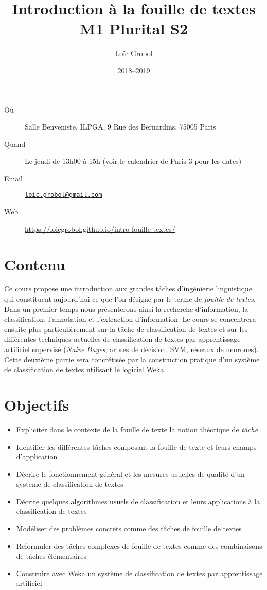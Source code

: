 \documentclass[a4paper, 11pt]{article}
\title{Introduction à la fouille de textes\\M1 Plurital S2}
\author{Loïc Grobol}
\date{2018–2019}
\begin{document}
\vspace*{-7em}
{\let\newpage\relax\maketitle}
\thispagestyle{main}

\begin{description}
    \item[Où] Salle Benveniste, ILPGA, 9 Rue des Bernardins, 75005 Paris
    \item[Quand] Le jeudi de 13h00 à 15h (voir le calendrier de Paris 3 pour les dates)
    \item[Email] \href{mailto:loic.grobol@gmail.com}{\texttt{loic.grobol@gmail.com}}
    \item[Web] \url{https://loicgrobol.github.io/intro-fouille-textes/}
\end{description}

\section*{Contenu}
Ce cours propose une introduction aux grandes tâches d'ingénierie linguistique qui constituent aujourd'hui ce que l'on désigne par le terme de \emph{fouille de textes}.
Dans un premier temps nous présenterons ainsi la recherche d'information, la classification, l'annotation et l'extraction d'information.
Le  cours se  concentrera ensuite plus particulièrement sur la tâche de classification de textes et sur les différentes techniques actuelles de classification de textes par apprentissage artificiel supervisé (\emph{Naive Bayes}, arbres de décision, SVM, réseaux de neurones).
Cette deuxième partie sera concrétisée par la construction pratique d'un système de classification de textes utilisant le logiciel Weka.

\section*{Objectifs}

\begin{itemize}
    \item Expliciter dans le contexte de la fouille de texte la notion théorique de \emph{tâche}
    \item Identifier les différentes tâches composant la fouille de texte et leurs champs d'application
    \item Décrire le fonctionnement général et les mesures usuelles de qualité d'un système de classification de textes
    \item Décrire quelques algorithmes usuels de classification et leurs applications à la classification de textes
    \item Modéliser des problèmes concrets comme des tâches de fouille de textes
    \item Reformuler des tâches complexes de fouille de textes comme des combinaisons de tâches élémentaires
    \item Construire avec Weka un système de classification de textes par apprentissage artificiel
\end{itemize}
\end{document}
